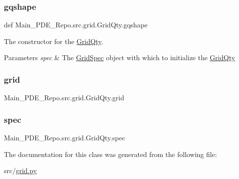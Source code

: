 \subsubsection{\texorpdfstring{gqshape}{gqshape}}
{\footnotesize\ttfamily def Main\+\_\+\+P\+D\+E\+\_\+\+Repo.\+src.\+grid.\+Grid\+Qty.\+gqshape}



The constructor for the \hyperlink{classMain__PDE__Repo_1_1src_1_1grid_1_1GridQty}{Grid\+Qty}. 


\begin{DoxyParams}{Parameters}
{\em spec} & The \hyperlink{classMain__PDE__Repo_1_1src_1_1grid_1_1GridSpec}{Grid\+Spec} object with which to initialize the \hyperlink{classMain__PDE__Repo_1_1src_1_1grid_1_1GridQty}{Grid\+Qty} \\
\hline
\end{DoxyParams}
\mbox{\label{classMain__PDE__Repo_1_1src_1_1grid_1_1GridQty_a78259425113459873f41c8ece6d05c1c}} 
\subsubsection{\texorpdfstring{grid}{grid}}
{\footnotesize\ttfamily Main\+\_\+\+P\+D\+E\+\_\+\+Repo.\+src.\+grid.\+Grid\+Qty.\+grid}

\mbox{\label{classMain__PDE__Repo_1_1src_1_1grid_1_1GridQty_af8f206d6eb9037737417e4fefb52990e}} 
\subsubsection{\texorpdfstring{spec}{spec}}
{\footnotesize\ttfamily Main\+\_\+\+P\+D\+E\+\_\+\+Repo.\+src.\+grid.\+Grid\+Qty.\+spec}



The documentation for this class was generated from the following file\+:\begin{DoxyCompactItemize}
\item 
src/\hyperlink{grid_8py}{grid.\+py}\end{DoxyCompactItemize}
